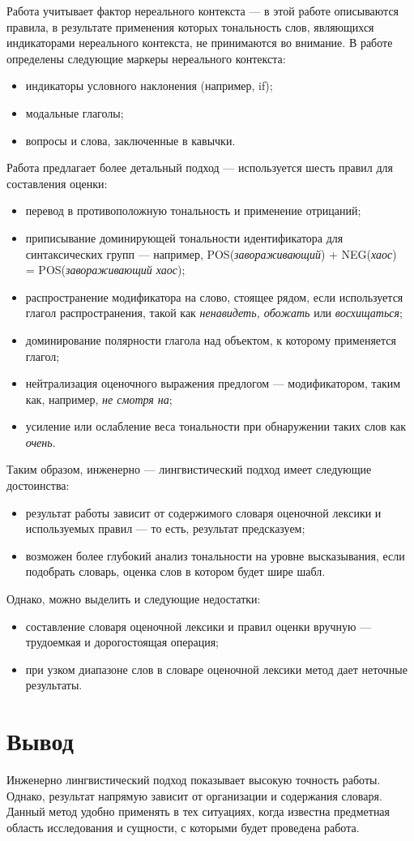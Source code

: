 Работа \cite{modf} учитывает фактор нереального контекста --- в этой работе описываются правила, в результате применения которых тональность слов, являющихся индикаторами нереального контекста, не принимаются во внимание. В работе определены следующие маркеры нереального контекста: 
\begin{itemize}
	\item индикаторы условного наклонения (например, if);
	\item модальные глаголы;
	\item вопросы и слова, заключенные в кавычки.
\end{itemize}

Работа \cite{8pattrns} предлагает более детальный подход --- используется шесть правил для составления оценки:
\begin{itemize}
	\item перевод в противоположную тональность и применение отрицаний;
	\item приписывание доминирующей тональности идентификатора для синтаксических групп --- например, POS(\textit{завораживающий}) + NEG(\textit{хаос}) \\ = POS(\textit{завораживающий хаос});
	\item распространение модификатора на слово, стоящее рядом, если используется глагол распространения, такой как \textit{ненавидеть, обожать} или \textit{восхищаться};
	\item доминирование полярности глагола над объектом, к которому применяется глагол;
	\item нейтрализация оценочного выражения предлогом --- модификатором, таким как, например, \textit{не смотря на};
	\item усиление или ослабление веса тональности при обнаружении таких слов как \textit{очень}.
\end{itemize}

Таким образом, инженерно --- лингвистический подход имеет следующие достоинства:
\begin{itemize}
	\item результат работы зависит от содержимого словаря оценочной лексики и используемых правил --- то есть, результат предсказуем;
	\item возможен более глубокий анализ тональности на уровне высказывания, если подобрать словарь, оценка слов в котором будет шире шабл.
\end{itemize}
Однако, можно выделить и следующие недостатки:
\begin{itemize}
	\item составление словаря оценочной лексики и правил оценки вручную --- трудоемкая и дорогостоящая операция;
	\item при узком диапазоне слов в словаре оценочной лексики метод дает неточные результаты. 
\end{itemize}
\section{Вывод}
Инженерно лингвистический подход показывает высокую точность работы. Однако, результат напрямую зависит от организации и содержания словаря. Данный метод удобно применять в тех ситуациях, когда известна предметная область исследования и сущности, с которыми будет проведена работа.